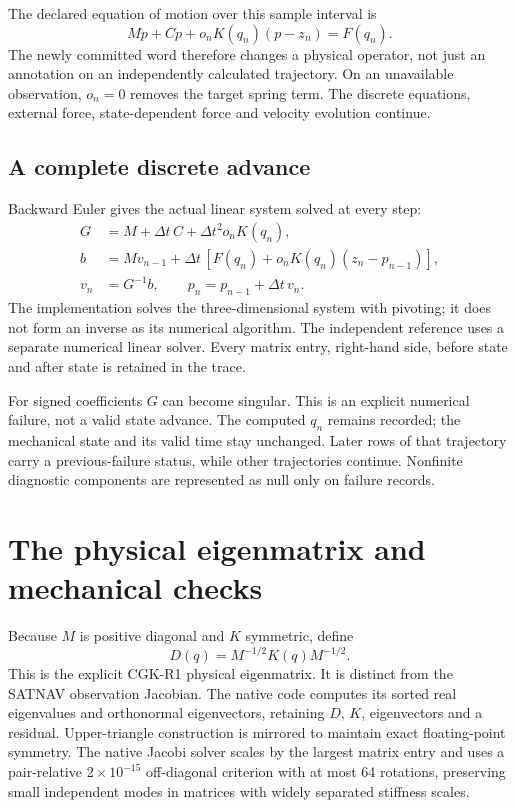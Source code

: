 The declared equation of motion over this sample interval is
\begin{equation}
M\ddot p+C\dot p+o_nK(q_n)(p-z_n)=F(q_n).
\label{eq:coupled-mechanics}
\end{equation}
The newly committed word therefore changes a physical operator, not just an
annotation on an independently calculated trajectory. On an unavailable observation,
$o_n=0$ removes the target spring term. The discrete equations, external force,
state-dependent force and velocity evolution continue.

\subsection{A complete discrete advance}
Backward Euler gives the actual linear system solved at every step:
\begin{align}
G&=M+\Delta t\,C+\Delta t^2 o_nK(q_n),\\
b&=Mv_{n-1}+\Delta t\,[F(q_n)+o_nK(q_n)(z_n-p_{n-1})],\\
v_n&=G^{-1}b,\qquad p_n=p_{n-1}+\Delta t\,v_n.
\end{align}
The implementation solves the three-dimensional system with pivoting; it does not
form an inverse as its numerical algorithm. The independent reference uses a
separate numerical linear solver. Every matrix entry, right-hand side, before
state and after state is retained in the trace.

For signed coefficients $G$ can become singular. This is an explicit numerical
failure, not a valid state advance. The computed $q_n$ remains recorded; the
mechanical state and its valid time stay unchanged. Later rows of that trajectory
carry a previous-failure status, while other trajectories continue. Nonfinite
diagnostic components are represented as null only on failure records.
\clearpage

\section{The physical eigenmatrix and mechanical checks}
Because $M$ is positive diagonal and $K$ symmetric, define
\begin{equation}
D(q)=M^{-1/2}K(q)M^{-1/2}.
\label{eq:physical-eigenmatrix}
\end{equation}
This is the explicit CGK-R1 physical eigenmatrix. It is distinct from the
SATNAV observation Jacobian. The native code computes its sorted real eigenvalues
and orthonormal eigenvectors, retaining $D$, $K$, eigenvectors and a residual.
Upper-triangle construction is mirrored to maintain exact floating-point symmetry.
The native Jacobi solver scales by the largest matrix entry and uses a pair-relative
$2\times10^{-15}$ off-diagonal criterion with at most 64 rotations, preserving
small independent modes in matrices with widely separated stiffness scales.

